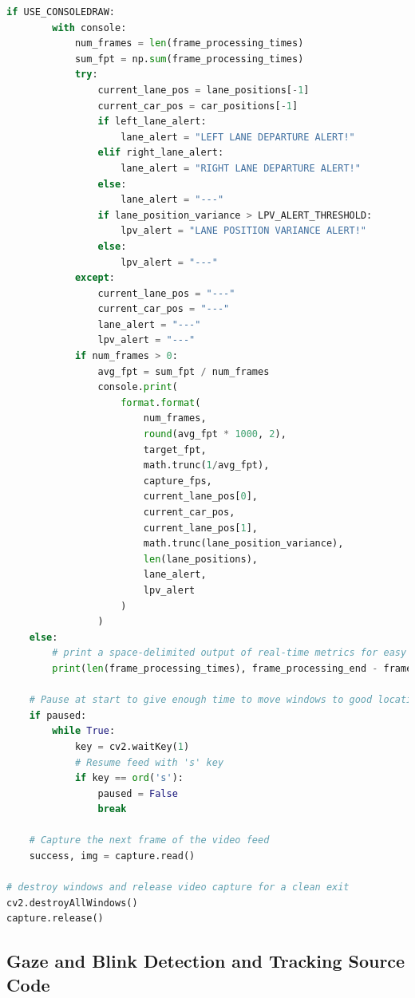 \documentclass[10pt,conference]{IEEEtran}
\begin{document}
\begin{lstlisting}[language=Python,basicstyle=\tiny, showspaces=false, showstringspaces=false tabsize=1, breaklines=true]
    if USE_CONSOLEDRAW:
        with console:
            num_frames = len(frame_processing_times)
            sum_fpt = np.sum(frame_processing_times)
            try:
                current_lane_pos = lane_positions[-1]
                current_car_pos = car_positions[-1]
                if left_lane_alert:
                    lane_alert = "LEFT LANE DEPARTURE ALERT!"
                elif right_lane_alert:
                    lane_alert = "RIGHT LANE DEPARTURE ALERT!"
                else:
                    lane_alert = "---"
                if lane_position_variance > LPV_ALERT_THRESHOLD:
                    lpv_alert = "LANE POSITION VARIANCE ALERT!"
                else:
                    lpv_alert = "---"
            except:
                current_lane_pos = "---"
                current_car_pos = "---"
                lane_alert = "---"
                lpv_alert = "---"
            if num_frames > 0:
                avg_fpt = sum_fpt / num_frames
                console.print(
                    format.format(
                        num_frames,
                        round(avg_fpt * 1000, 2),
                        target_fpt,
                        math.trunc(1/avg_fpt),
                        capture_fps,
                        current_lane_pos[0],
                        current_car_pos,
                        current_lane_pos[1],
                        math.trunc(lane_position_variance),
                        len(lane_positions),
                        lane_alert,
                        lpv_alert
                    )
                )
    else:
        # print a space-delimited output of real-time metrics for easy copy-pasting into MS Excel for graphing
        print(len(frame_processing_times), frame_processing_end - frame_processing_start, lane_position_variance, len(lane_positions))

    # Pause at start to give enough time to move windows to good locations
    if paused:
        while True:
            key = cv2.waitKey(1)
            # Resume feed with 's' key
            if key == ord('s'):
                paused = False
                break
    
    # Capture the next frame of the video feed
    success, img = capture.read()

# destroy windows and release video capture for a clean exit
cv2.destroyAllWindows()
capture.release()
\end{lstlisting}




\subsection{Gaze and Blink Detection and Tracking Source Code}
\label{a2}
\end{document}
